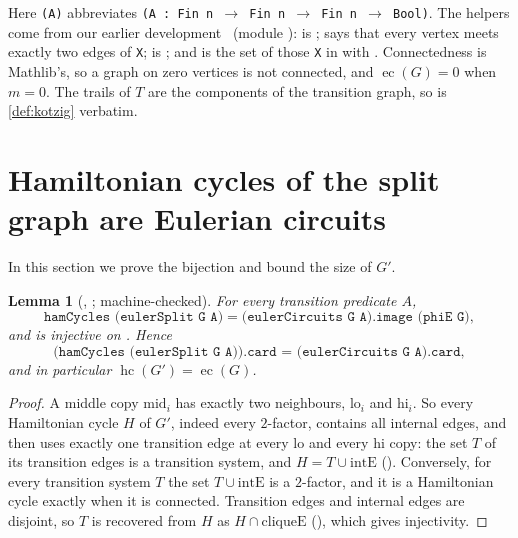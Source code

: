 \documentclass[10pt]{amsart}
\theoremstyle{plain}
\newtheorem{lemma}[theorem]{Lemma}
\theoremstyle{definition}
\theoremstyle{remark}
\numberwithin{equation}{section}
\newcommand{\EC}{\operatorname{ec}}
\newcommand{\HC}{\operatorname{hc}}
\begin{document}
Here \texttt{(A)} abbreviates \texttt{(A : Fin n $\to$ Fin n $\to$ Fin n $\to$ Bool)}. The helpers come
from our earlier development~\cite{Tulsyan26} (module ):
 is ;  says that every vertex
meets exactly two edges of \texttt{X};  is
; and  is the set of those
\texttt{X} in  with . Connectedness is Mathlib's, so
a graph on zero vertices is not connected, and $\EC(G)=0$ when $m=0$. The trails of $T$ are the
components of the transition graph, so  is \cref{def:kotzig} verbatim.

\section{Hamiltonian cycles of the split graph are Eulerian circuits}\label{sec:bijection}

In this section we prove the bijection and bound the size of $G'$.

\begin{lemma}[, ; machine-checked]\label{lem:bij}
For every transition predicate $A$,
\[
  \texttt{hamCycles (eulerSplit G A)} = \texttt{(eulerCircuits G A).image (phiE G)},
\]
and  is injective on . Hence
\[
  \texttt{(hamCycles (eulerSplit G A)).card = (eulerCircuits G A).card},
\]
and in particular $\HC(G')=\EC(G)$.
\end{lemma}

\begin{proof}
A middle copy $\mathrm{mid}_i$ has exactly two neighbours, $\mathrm{lo}_i$ and $\mathrm{hi}_i$. So
every Hamiltonian cycle $H$ of $G'$, indeed every $2$-factor, contains all internal edges, and then
uses exactly one transition edge at every $\mathrm{lo}$ and every $\mathrm{hi}$ copy: the set $T$ of
its transition edges is a transition system, and $H=T\cup\mathrm{intE}$
(). Conversely, for every transition system $T$ the set
$T\cup\mathrm{intE}$ is a $2$-factor, and it is a Hamiltonian cycle exactly when it is connected.
Transition edges and internal edges are disjoint, so $T$ is recovered from $H$ as $H\cap\mathrm{cliqueE}$
(), which gives injectivity.
\end{proof}
\end{document}
